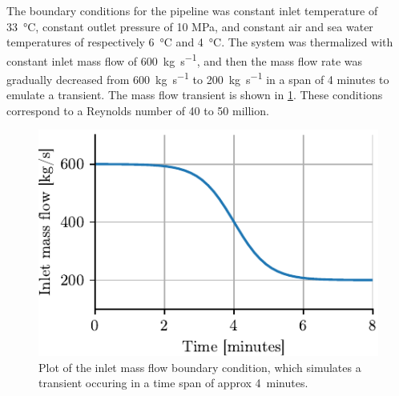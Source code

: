 The boundary conditions for the pipeline was constant inlet temperature of \SI{33}{\degreeCelsius}, constant outlet pressure of 10 MPa, and constant air and sea water temperatures of respectively \SI{6}{\degreeCelsius} and \SI{4}{\degreeCelsius}. The system was thermalized with constant inlet mass flow of \SI{600}{\kg\per\second}, and then the mass flow rate was gradually decreased from \SI{600}{\kg\per\second} to \SI{200}{\kg\per\second} in a span of 4 minutes to emulate a transient. The mass flow transient is shown in \cref{fig:massFlowBoundaryCondition}. These conditions correspond to a Reynolds number of 40 to 50 million.

\begin{figure}[ht]%
    \centering%
    \includegraphics{figures/inlet_mass_flow.pdf}%
    \caption{%
        Plot of the inlet mass flow boundary condition, which simulates a transient occuring in a time span of approx 4~minutes.
        \label{fig:massFlowBoundaryCondition}%
    }%
\end{figure}%

